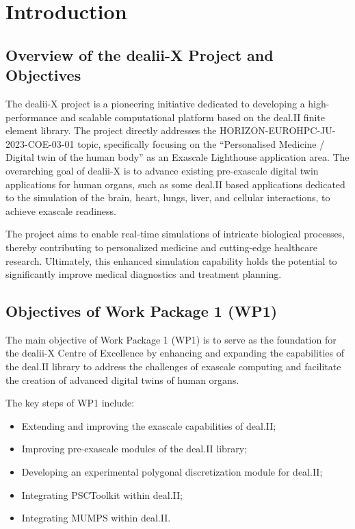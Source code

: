 \documentclass[a4paper,12pt]{article}
\begin{document}
\vspace*{2cm}

\disclaimer

\newpage

\tableofcontents %

\newpage

\section{{Introduction}}

\subsection{Overview of the dealii-X Project and Objectives}

The dealii-X project is a pioneering initiative dedicated to developing a
high-performance and scalable computational platform based on the deal.II finite
element library. The project directly addresses the
HORIZON-EUROHPC-JU-2023-COE-03-01 topic, specifically focusing on the
``Personalised Medicine / Digital twin of the human body'' as an Exascale
Lighthouse application area. The overarching goal of dealii-X is to advance
existing pre-exascale digital twin applications for human organs, such as some
deal.II based applications dedicated to the simulation of the brain, heart,
lungs, liver, and cellular interactions, to achieve exascale readiness. 

The project aims to enable real-time simulations of intricate biological
processes, thereby contributing to personalized medicine and cutting-edge
healthcare research. Ultimately, this enhanced simulation capability holds the
potential to significantly improve medical diagnostics and treatment planning.

\subsection{Objectives of Work Package 1 (WP1)}

The main objective of Work Package 1 (WP1) is to serve as the foundation
for the dealii-X Centre of Excellence by enhancing and expanding the
capabilities of the deal.II library to address the challenges of exascale
computing and facilitate the creation of advanced digital twins of human
organs.

The key steps of WP1 include:
\begin{itemize}
\item Extending and improving the exascale capabilities of deal.II;
\item Improving pre-exascale modules of the deal.II library;
\item Developing an experimental polygonal discretization module for
  deal.II;
\item Integrating PSCToolkit within deal.II;
\item Integrating MUMPS within deal.II.
\end{itemize}
\end{document}
